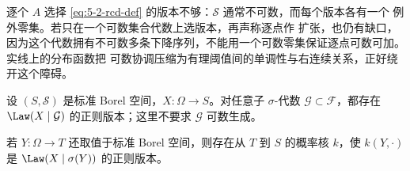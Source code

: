 逐个 $A$ 选择 \eqref{eq:5-2-rcd-def} 的版本不够：$\mathcal S$ 通常不可数，而每个版本各有一个
例外零集。若只在一个可数集合代数上选版本，再声称逐点作 \Caratheodory{} 扩张，也仍有缺口，
因为这个代数拥有不可数多条下降序列，不能用一个可数零集保证逐点可数可加。实线上的分布函数把
可数协调压缩为有理阈值间的单调性与右连续关系，正好绕开这个障碍。

\begin{theorem}[正则条件分布的存在性]\label{theorem:5-2-2-1}
设 $(S,\mathcal S)$ 是标准 Borel 空间，$X:\Omega\to S$。对任意子 $\sigma$-代数
$\mathcal G\subset\mathcal F$，都存在 $\Law(X\mid\mathcal G)$ 的正则版本；这里不要求
$\mathcal G$ 可数生成。

若 $Y:\Omega\to T$ 还取值于标准 Borel 空间，则存在从 $T$ 到 $S$ 的概率核 $k$，使
$k(Y,\cdot)$ 是 $\Law(X\mid\sigma(Y))$ 的正则版本。
\end{theorem}

